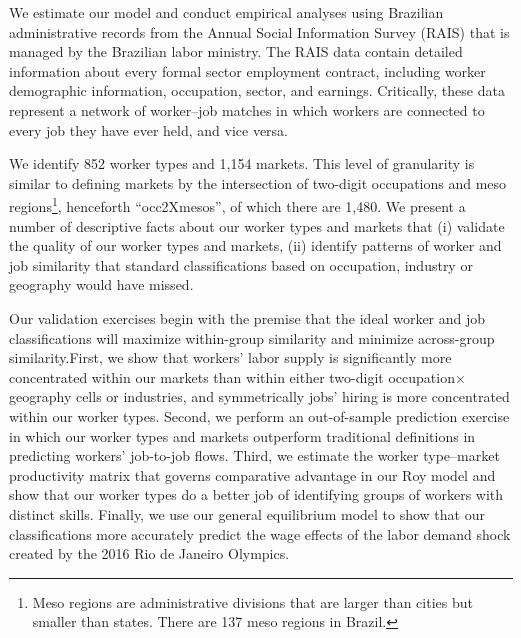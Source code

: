 \documentclass[12pt]{article}
\theoremstyle{definition}
\theoremstyle{plain}
\begin{document}
We estimate our model and conduct empirical analyses using Brazilian administrative records from the Annual Social Information Survey (RAIS) that is managed by the Brazilian labor ministry. The RAIS data contain detailed information about every formal sector employment contract, including worker demographic information, occupation, sector, and earnings. Critically, these data represent a network of worker--job matches in which workers are connected to every job they have ever held, and vice versa.




We identify 852 worker types and 1,154 markets. This level of granularity is similar to defining markets by the intersection of two-digit occupations and meso regions\footnote{Meso regions are administrative divisions that are larger than cities but smaller than states. There are 137 meso regions in Brazil.}, henceforth ``occ2Xmesos'', of which there are 1,480. We present a number of descriptive facts about our worker types and markets that (i) validate the quality of our worker types and markets, (ii) identify patterns of worker and job similarity that standard classifications based on occupation, industry or geography would have missed.


Our validation exercises begin with the premise that the ideal worker and job classifications will maximize within-group similarity and minimize across-group similarity.First, we show that workers' labor supply is significantly more concentrated within our markets than within either two-digit occupation$\times$geography cells or industries, and symmetrically jobs' hiring is more concentrated within our worker types. Second, we perform an out-of-sample prediction exercise in which our worker types and markets outperform traditional definitions in predicting workers' job-to-job flows. Third, we estimate the worker type--market productivity matrix that governs comparative advantage in our Roy model and show that our worker types do a better job of identifying groups of workers with distinct skills. Finally, we use our general equilibrium model to show that our classifications more accurately predict the wage effects of the labor demand shock created by the 2016 Rio de Janeiro Olympics. 
\end{document}

